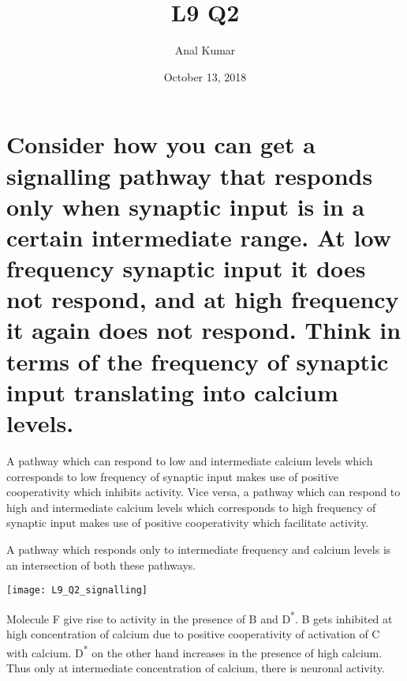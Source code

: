\documentclass{article}
\title{L9 Q2}
\date{October 13, 2018}
\author{Anal Kumar}
\begin{document}
\maketitle
{}

\section*{Consider how you can get a signalling pathway that responds only when synaptic input is in a certain intermediate range. At low frequency synaptic input it does not respond, and at high frequency it again does not respond. Think in terms of the frequency of synaptic input translating into calcium levels.}

A pathway which can respond to low and intermediate calcium levels which corresponds to low frequency of synaptic input makes use of positive cooperativity which inhibits activity. Vice versa, a pathway which can respond to high and intermediate calcium levels which corresponds to high frequency of synaptic input makes use of positive cooperativity which facilitate activity.

A pathway which responds only to intermediate frequency and calcium levels is an intersection of both these pathways.

\texttt{[image: L9\_Q2\_signalling]}

Molecule F give rise to activity in the presence of B and D\textsuperscript{*}. B gets inhibited at high concentration of calcium due to positive cooperativity of activation of C with calcium. D\textsuperscript{*} on the other hand increases in the presence of high calcium. Thus only at intermediate concentration of calcium, there is neuronal activity.
\end{document}
